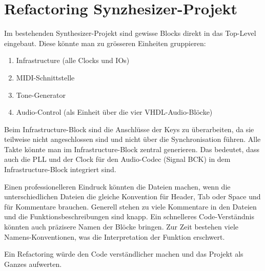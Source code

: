 \section{Refactoring Synzhesizer-Projekt}

Im bestehenden Synthesizer-Projekt sind gewisse Blocks direkt in das Top-Level eingebaut. Diese könnte man zu grösseren Einheiten gruppieren:
\begin{enumerate}
 \item Infrastructure (alle Clocks und IOs)
 \item MIDI-Schnittstelle
 \item Tone-Generator
 \item Audio-Control (als Einheit über die vier VHDL-Audio-Blöcke)
\end{enumerate}

Beim Infrastructure-Block sind die Anschlüsse der Keys zu überarbeiten, da sie teilweise nicht angeschlossen sind und nicht über die Synchronisation führen. Alle Takte könnte man im Infrastructure-Block zentral generieren. Das bedeutet, dass auch die PLL und der Clock für den Audio-Codec (Signal BCK) in dem Infrastructure-Block integriert sind.

Einen professionelleren Eindruck könnten die Dateien machen, wenn die unterschiedlichen Dateien die gleiche Konvention für Header, Tab oder Space und für Kommentare brauchen. Generell stehen zu viele Kommentare in den Dateien und die Funktionsbeschreibungen sind knapp. Ein schnelleres Code-Verständnis könnten auch präzisere Namen der Blöcke bringen. Zur Zeit bestehen viele Namens-Konventionen, was die Interpretation der Funktion erschwert.

Ein Refactoring würde den Code verständlicher machen und das Projekt als Ganzes aufwerten.

